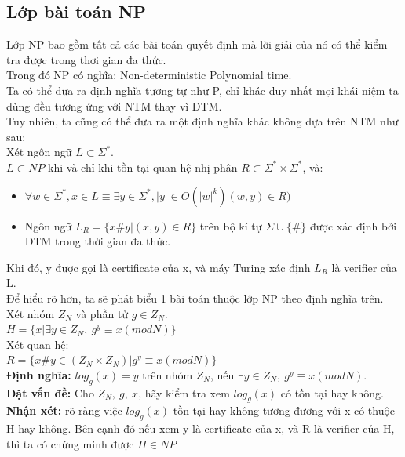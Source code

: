 \documentclass[a4paper 14pt]{extarticle}
\begin{document}
		\subsection{Lớp bài toán NP}
			Lớp NP bao gồm tất cả các bài toán quyết định mà lời giải của nó có thể kiểm tra được trong thơi gian đa thức.\\
			Trong đó NP có nghĩa: Non-deterministic Polynomial time.\\
			Ta có thể đưa ra định nghĩa tương tự như P, chỉ khác duy nhất mọi khái niệm ta dùng đều tương ứng với NTM thay vì DTM.\\
			Tuy nhiên, ta cũng có thể đưa ra một định nghĩa khác không dựa trên NTM như sau:\\
			Xét ngôn ngữ $L \subset \Sigma^{*}$.\\
			$L \subset NP$ khi và chỉ khi tồn tại quan hệ nhị phân $R \subset \Sigma^{*} \times \Sigma^{*}$, và:
			\begin{itemize}
				\item $\forall w \in \Sigma^{*}, x \in L \equiv \exists y \in \Sigma^{*}, |y| \in O(|w|^k) (w,y) \in R)$
				\item Ngôn ngữ $L_R = \{x\#y| (x,y) \in R\}$ trên bộ kí tự $\Sigma \cup \{\#\}$ được xác định bởi DTM trong thời gian đa thức.
			\end{itemize}
			Khi đó, y được gọi là certificate của x, và máy Turing xác định $L_R$ là verifier của L.\\
			\vspace{0.5cm}
			Để hiểu rõ hơn, ta sẽ phát biểu 1 bài toán thuộc lớp NP theo định nghĩa trên.\\
			Xét nhóm $Z_N$ và phần tử  $g \in Z_N$. \\
			$H = \{x | \exists y \in Z_N,~ g^y \equiv x (mod N)\}$\\
			Xét quan hệ:\\
			$R = \{x\#y \in (Z_N\times Z_N)| g^y \equiv x (mod N)\}$\\
			\textbf{Định nghĩa:} $log_g(x) = y$ trên nhóm $Z_N$, nếu  $\exists y \in Z_N,~ g^y \equiv x (mod N)$.\\
			\textbf{Đặt vấn đề:} Cho $Z_N,~g,~x$, hãy kiểm tra xem $log_g(x)$ có tồn tại hay không.\\
			\textbf{Nhận xét:} rõ ràng việc $log_g(x)$ tồn tại hay không tương đương với x có thuộc H hay không. Bên cạnh đó nếu xem y là certificate của x, và R là verifier của H, thì ta có chứng minh được $H \in NP$\\
			\vspace{0.5cm}
			
\end{document}

